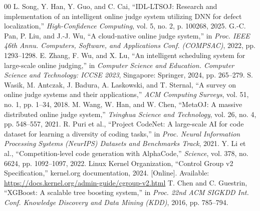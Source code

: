\documentclass[conference]{IEEEtran}
\begin{document}

\begin{thebibliography}{00}
 L. Song, Y. Han, Y. Guo, and C. Cai, ``IDL-LTSOJ: Research and implementation of an intelligent online judge system utilizing DNN for defect localization,'' \textit{High-Confidence Computing}, vol. 5, no. 2, p. 100268, 2025.
 G.-C. Pan, P. Liu, and J.-J. Wu, ``A cloud-native online judge system,'' in \textit{Proc. IEEE 46th Annu. Computers, Software, and Applications Conf. (COMPSAC)}, 2022, pp. 1293--1298.
 E. Zhang, F. Wu, and X. Lu, ``An intelligent scheduling system for large-scale online judging,'' in \textit{Computer Science and Education. Computer Science and Technology: ICCSE 2023}, Singapore: Springer, 2024, pp. 265--279.
 S. Wasik, M. Antczak, J. Badura, A. Laskowski, and T. Sternal, ``A survey on online judge systems and their applications,'' \textit{ACM Computing Surveys}, vol. 51, no. 1, pp. 1--34, 2018.
 M. Wang, W. Han, and W. Chen, ``MetaOJ: A massive distributed online judge system,'' \textit{Tsinghua Science and Technology}, vol. 26, no. 4, pp. 548--557, 2021.
 R. Puri et al., ``Project CodeNet: A large-scale AI for code dataset for learning a diversity of coding tasks,'' in \textit{Proc. Neural Information Processing Systems (NeurIPS) Datasets and Benchmarks Track}, 2021.
 Y. Li et al., ``Competition-level code generation with AlphaCode,'' \textit{Science}, vol. 378, no. 6624, pp. 1092--1097, 2022.
 Linux Kernel Organization, ``Control Group v2 Specification,'' kernel.org documentation, 2024. [Online]. Available: \url{https://docs.kernel.org/admin-guide/cgroup-v2.html}
 T. Chen and C. Guestrin, ``XGBoost: A scalable tree boosting system,'' in \textit{Proc. 22nd ACM SIGKDD Int. Conf. Knowledge Discovery and Data Mining (KDD)}, 2016, pp. 785--794.
\end{thebibliography}
\end{document}
